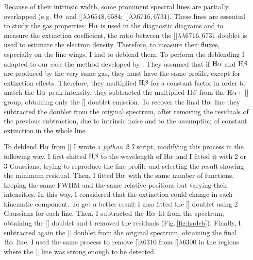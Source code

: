 \documentclass[../thesis.tex]{subfiles}
\begin{document}
Because of their intrinsic width, some prominent spectral lines are partially overlapped (e.g. $\rm H\alpha$ and []$\lambda\lambda6548,6584$; []$\lambda\lambda6716,6731$).
These lines are essential to study the gas properties: $\rm H\alpha$ is used in the diagnostic diagrams \citep{Baldwin81,Veilleux87}  and to measure the extinction coefficient, the ratio between the []$\lambda\lambda6716,6731$ doublet is used to estimate the electron density.
Therefore, to measure their fluxes, especially on the line wings, I had to deblend them.
To perform the deblending I adapted to our case the method developed by \citet{Schirmer13}.
They assumed that if $\rm H\alpha$ and $\rm H\beta$ are produced by the very same gas, they must have the same profile, except for extinction effects.
Therefore, they multiplied $\rm H\beta$ for a constant factor in order to match the $\rm H\alpha$ peak intensity, they subtracted the multiplied $\rm H\beta$ from the $\rm H\alpha +$ [] group, obtaining only the [] doublet emission.
To recover the final $\rm H\alpha$ line they subtracted the doublet from the original spectrum, after removing the residuals of the previous subtraction, due to intrinsic noise and to the assumption of constant extinction in the whole line.

To deblend $\rm H\alpha$ from [] I wrote a \textit{python 2.7} script, modifying this process in the following way. 
I first shifted $\rm H\beta$ to the wavelength of $\rm H\alpha$ and I fitted it with $2$ or $3$ Gaussians, trying to reproduce the line profile and selecting the result showing the minimum residual.
Then, I fitted $\rm H\alpha$ with the same number of functions, keeping the same FWHM and the same relative positions but varying their intensities.
In this way, I considered that the extinction could change in each kinematic component.
To get a better result I also fitted the [] doublet using $2$ Gaussians for each line.
Then, I subtracted the $\rm H\alpha$ fit from the spectrum, obtaining the [] doublet and I removed the residuals (Fig.\,\ref{fig:hadeb}).
Finally, I subtracted again the [] doublet from the original spectrum, obtaining the final $\rm H\alpha$ line.
I used the same process to remove []$\lambda6310$ from []$\lambda6300$ in the regions where the [] line was strong enough to be detected.
\end{document}
